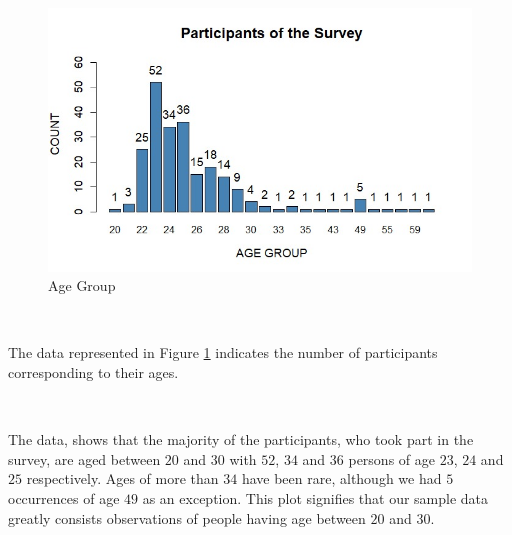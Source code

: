 \begin{figure}[h!]
	\centering
	\includegraphics[width=0.8\linewidth]{IMAGES/Image 4.jpg}
	\caption{Age Group}
	\label{G4}
\end{figure}

\ 

The data represented in Figure \ref{G4} indicates the number of participants corresponding to their ages.

\ 

The data, shows that the majority of the participants, who took part in the survey, are aged between $20$ and $30$ with $52$, $34$ and $36$ persons of age $23$, $24$ and $25$ respectively. Ages of more than $34$ have been rare, although we had $5$ occurrences of age $49$ as an exception. This plot signifies that our sample data greatly consists observations of people having age between $20$ and $30$.